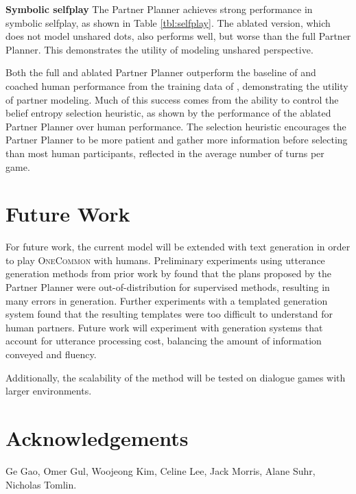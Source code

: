 \documentclass[11pt]{article}
\begin{document}
\textbf{Symbolic selfplay}
The Partner Planner achieves strong performance in symbolic selfplay, as shown in Table \ref{tbl:selfplay}.
The ablated version, which does not model unshared dots, also performs well, but worse than the full Partner Planner.
This demonstrates the utility of modeling unshared perspective.

Both the full and ablated Partner Planner outperform the baseline of \citet{fried} and coached human performance from the training data of \citet{onecommon}, demonstrating the utility of partner modeling.
Much of this success comes from the ability to control the
belief entropy selection heuristic, as shown by the performance of the ablated Partner Planner over human performance.
The selection heuristic encourages the Partner Planner to be more patient and gather more information before selecting than most human participants,
reflected in the average number of turns per game.

\section{Future Work}
For future work, the current model will be extended with text generation in order to play \textsc{OneCommon} with humans.
Preliminary experiments using utterance generation methods from prior work by \citet{fried} found that the plans proposed by the Partner Planner were out-of-distribution for supervised methods, resulting in many errors in generation.
Further experiments with a templated generation system found that the resulting templates were too difficult to understand for human partners.
Future work will experiment with generation systems that account for utterance processing cost, balancing the amount of information conveyed and fluency.

Additionally, the scalability of the method will be tested on dialogue games with larger environments.


\section*{Acknowledgements}
Ge Gao, Omer Gul, Woojeong Kim, Celine Lee, Jack Morris, Alane Suhr, Nicholas Tomlin.
\end{document}
